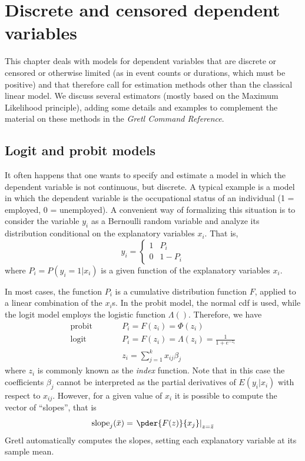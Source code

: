 \chapter{Discrete and censored dependent variables}
\label{chap:probit}

This chapter deals with models for dependent variables that are
discrete or censored or otherwise limited (as in event counts or
durations, which must be positive) and that therefore call for
estimation methods other than the classical linear model. We discuss
several estimators (mostly based on the Maximum Likelihood principle),
adding some details and examples to complement the material on
these methods in the \emph{Gretl Command Reference}.

\section{Logit and probit models}
\label{sec:logit-probit}

It often happens that one wants to specify and estimate a model in
which the dependent variable is not continuous, but discrete. A
typical example is a model in which the dependent variable is the
occupational status of an individual (1 = employed, 0 = unemployed). A
convenient way of formalizing this situation is to consider the
variable $y_i$ as a Bernoulli random variable and analyze its
distribution conditional on the explanatory variables $x_i$.  That is,
%
\begin{equation}
  \label{eq:qr-Bernoulli}
  y_i = \left\{ 
    \begin{array}{ll} 
      1 & P_i \\ 0 & 1 - P_i 
    \end{array}
    \right.
\end{equation}
%
where $P_i = P(y_i = 1 | x_i) $ is a given function of the explanatory
variables $x_i$.

In most cases, the function $P_i$ is a cumulative distribution
function $F$, applied to a linear combination of the $x_i$s. In the
probit model, the normal cdf is used, while the logit model employs
the logistic function $\Lambda()$. Therefore, we have
%
\begin{eqnarray}
  \label{eq:qr-link}
  \textrm{probit} & \qquad & P_i = F(z_i) = \Phi(z_i)  \\
  \textrm{logit}  & \qquad & P_i = F(z_i) = \Lambda(z_i) = \frac{1}{1 + e^{-z_i}} \\
  & &z_i = \sum_{j=1}^k x_{ij} \beta_j
\end{eqnarray}
%
where $z_i$ is commonly known as the \emph{index} function. Note that
in this case the coefficients $\beta_j$ cannot be interpreted as the
partial derivatives of $E(y_i | x_i)$ with respect to
$x_{ij}$.  However, for a given value of $x_i$ it is possible to
compute the vector of ``slopes'', that is
\[
  \mathrm{slope}_j(\bar{x}) = \left. \pder{F(z)}{x_j} \right|_{z =
    \bar{z}}
\]
Gretl automatically computes the slopes, setting each
explanatory variable at its sample mean.

